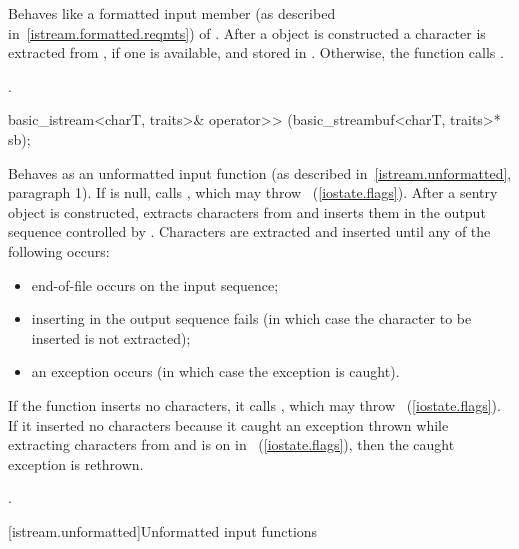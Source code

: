 \begin{itemdescr}
\pnum
\effects
Behaves like a formatted input member (as described in~\ref{istream.formatted.reqmts})
of .
After a
object is constructed
a character is extracted from , if one is available, and stored in .
Otherwise, the function calls
.

\pnum
\returns
{}.
\end{itemdescr}

%
%
\begin{itemdecl}
basic_istream<charT, traits>& operator>>
  (basic_streambuf<charT, traits>* sb);
\end{itemdecl}

\begin{itemdescr}
\pnum
\effects
Behaves as an unformatted input function (as described
in~\ref{istream.unformatted}, paragraph 1).
If  is null, calls
,
which may throw
~(\ref{iostate.flags}).
After a sentry object is constructed, extracts
characters from
and inserts them in the output sequence controlled by .
Characters are extracted and inserted until any of the following occurs:
\begin{itemize}
\item
end-of-file occurs on the input sequence;
\item
inserting in the output sequence fails
(in which case the character to be inserted is not extracted);
\item
an exception occurs (in which case the exception is caught).
\end{itemize}

\pnum
If the function inserts no characters, it calls
,
which may throw
~(\ref{iostate.flags}).
If it inserted no characters because it caught
an exception thrown while extracting characters from
and
is on in
~(\ref{iostate.flags}),
then the caught exception is rethrown.

\pnum
\returns
{}.
\end{itemdescr}

[istream.unformatted]{Unformatted input functions}

